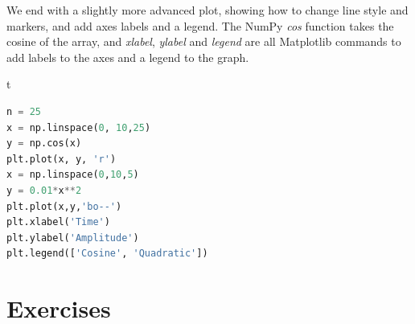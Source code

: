 \documentclass[a4paper , 12pt]{book}
\begin{document}
We end with a slightly more advanced plot, showing how to change line style and markers, and add axes labels and a legend. The NumPy \textit{cos} function takes the cosine of the array, and \textit{xlabel}, \textit{ylabel} and \textit{legend} are all Matplotlib commands to add labels to the axes and a legend to the graph.

\begin{center} {t}
\begin{lstlisting}[language=Python, frame=single]
n = 25
x = np.linspace(0, 10,25)
y = np.cos(x)
plt.plot(x, y, 'r')
x = np.linspace(0,10,5)
y = 0.01*x**2
plt.plot(x,y,'bo--')
plt.xlabel('Time')
plt.ylabel('Amplitude')
plt.legend(['Cosine', 'Quadratic'])
\end{lstlisting}
\end{center}

\section{Exercises}
\end{document}
